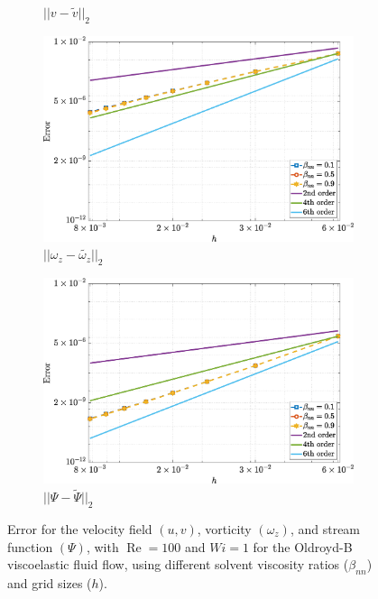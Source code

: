 \documentclass[preprint, 12pt]{elsarticle}
\begin{document}
\begin{figure}[H]
\begin{subfigure}[b]{.46\textwidth}
        \caption{$||v - \widetilde{v}||_{2}$}
        \label{error_v_2nd_Case1_oldorydb}
    \end{subfigure}
    \qquad
    \begin{subfigure}[b]{.46\textwidth}
        \includegraphics[width=\textwidth]{NormErr_2nd_Re_100_Wi_1_epsilon_0_xi_0_alphaG_0_Dt_1e-06_at_0.05_tipsim_1_MMS_12_Wz.eps}
        \caption{$||\omega_{z} - \widetilde{\omega_{z}}||_{2}$}
        \label{error_wz_2nd_Case1_oldorydb}
    \end{subfigure}
    \vspace{0.02cm}
    \qquad
    \begin{subfigure}[b]{.46\textwidth}
        \includegraphics[width=\textwidth]{NormErr_2nd_Re_100_Wi_1_epsilon_0_xi_0_alphaG_0_Dt_1e-06_at_0.05_tipsim_1_MMS_12_Psi.eps}
        \caption{$||\Psi - \widetilde{\Psi}||_{2}$}
        \label{error_psi_2nd_Case1_oldorydb}
    \end{subfigure}
    \vspace{0.02cm}
    \caption{Error for the velocity field $({u},{v})$, vorticity $({\omega_{z}})$, and stream function $({\Psi})$, with $\operatorname{Re}=100$ and $Wi=1$ for the Oldroyd-B viscoelastic fluid flow, using different solvent viscosity ratios ($\beta_{nn}$) and grid sizes ($h$).\label{fig_OldroydB_error_uvwzpsi}}
\end{figure}
\end{document}
